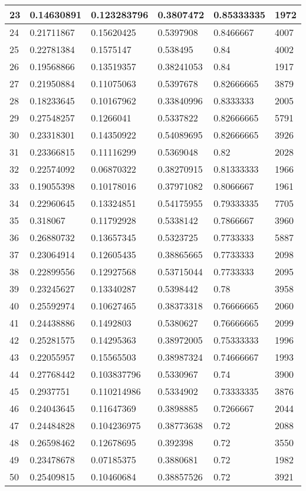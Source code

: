 \begin{longtable}{|l|l|l|l|l|l|}
23 & 0.14630891 & 0.123283796 & 0.3807472 & 0.85333335 & 1972 \\ \hline 
24 & 0.21711867 & 0.15620425 & 0.5397908 & 0.8466667 & 4007 \\ \hline 
25 & 0.22781384 & 0.1575147 & 0.538495 & 0.84 & 4002 \\ \hline 
26 & 0.19568866 & 0.13519357 & 0.38241053 & 0.84 & 1917 \\ \hline 
27 & 0.21950884 & 0.11075063 & 0.5397678 & 0.82666665 & 3879 \\ \hline 
28 & 0.18233645 & 0.10167962 & 0.33840996 & 0.8333333 & 2005 \\ \hline 
29 & 0.27548257 & 0.1266041 & 0.5337822 & 0.82666665 & 5791 \\ \hline 
30 & 0.23318301 & 0.14350922 & 0.54089695 & 0.82666665 & 3926 \\ \hline 
31 & 0.23366815 & 0.11116299 & 0.5369048 & 0.82 & 2028 \\ \hline 
32 & 0.22574092 & 0.06870322 & 0.38270915 & 0.81333333 & 1966 \\ \hline 
33 & 0.19055398 & 0.10178016 & 0.37971082 & 0.8066667 & 1961 \\ \hline 
34 & 0.22960645 & 0.13324851 & 0.54175955 & 0.79333335 & 7705 \\ \hline 
35 & 0.318067 & 0.11792928 & 0.5338142 & 0.7866667 & 3960 \\ \hline 
36 & 0.26880732 & 0.13657345 & 0.5323725 & 0.7733333 & 5887 \\ \hline 
37 & 0.23064914 & 0.12605435 & 0.38865665 & 0.7733333 & 2098 \\ \hline 
38 & 0.22899556 & 0.12927568 & 0.53715044 & 0.7733333 & 2095 \\ \hline 
39 & 0.23245627 & 0.13340287 & 0.5398442 & 0.78 & 3958 \\ \hline 
40 & 0.25592974 & 0.10627465 & 0.38373318 & 0.76666665 & 2060 \\ \hline 
41 & 0.24438886 & 0.1492803 & 0.5380627 & 0.76666665 & 2099 \\ \hline 
42 & 0.25281575 & 0.14295363 & 0.38972005 & 0.75333333 & 1996 \\ \hline 
43 & 0.22055957 & 0.15565503 & 0.38987324 & 0.74666667 & 1993 \\ \hline 
44 & 0.27768442 & 0.103837796 & 0.5330967 & 0.74 & 3900 \\ \hline 
45 & 0.2937751 & 0.110214986 & 0.5334902 & 0.73333335 & 3876 \\ \hline 
46 & 0.24043645 & 0.11647369 & 0.3898885 & 0.7266667 & 2044 \\ \hline 
47 & 0.24484828 & 0.104236975 & 0.38773638 & 0.72 & 2088 \\ \hline 
48 & 0.26598462 & 0.12678695 & 0.392398 & 0.72 & 3550 \\ \hline 
49 & 0.23478678 & 0.07185375 & 0.3880681 & 0.72 & 1982 \\ \hline 
50 & 0.25409815 & 0.10460684 & 0.38857526 & 0.72 & 3921 \\ \hline 
\end{longtable}